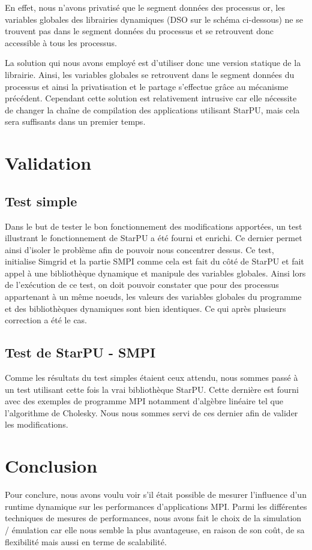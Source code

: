 \documentclass[smallextended]{svjour3}
\begin{document}
En effet, nous n'avons privatisé que le segment données des
processus or, les variables globales des librairies dynamiques (DSO
sur le schéma ci-dessous) ne se trouvent pas dans le segment données
du processus et se retrouvent donc accessible à tous les processus. 

La solution qui nous avons employé est d'utiliser donc une version
statique de la librairie. Ainsi, les variables globales se
retrouvent dans le segment données du processus et ainsi la
privatisation et le partage s'effectue grâce au mécanisme
précédent. Cependant cette solution est relativement intrusive car elle
nécessite de changer la chaîne de compilation des applications
utilisant StarPU, mais cela sera suffisants dans un premier temps. 

\section{Validation}
\label{sec-6}
\subsection{Test simple}
\label{sec-6-1}
Dans le but de tester le bon fonctionnement des modifications
apportées, un test illustrant le fonctionnement de StarPU a été
fourni et enrichi. Ce dernier permet ainsi d'isoler le problème
afin de pouvoir nous concentrer dessus. Ce test, initialise Simgrid
et la partie SMPI comme cela est fait du côté de StarPU et fait
appel à une bibliothèque dynamique et manipule des variables
globales. Ainsi lors de l'exécution de ce test, on doit pouvoir
constater que pour des processus appartenant à un même noeuds, les
valeurs des variables globales du programme et des bibliothèques
dynamiques sont bien identiques. Ce qui après plusieurs correction
a été le cas.  
\subsection{Test de StarPU - SMPI}
\label{sec-6-2}
Comme les résultats du test simples étaient ceux attendu, nous
sommes passé à un test utilisant cette fois la vrai bibliothèque
StarPU. Cette dernière est fourni avec des exemples de programme MPI
notamment d'algèbre linéaire tel que l'algorithme de Cholesky. Nous
nous sommes servi de ces dernier afin de valider les
modifications.

\section{Conclusion}
\label{sec-7}
Pour conclure, nous avons voulu voir s'il était possible de mesurer
l'influence d'un runtime dynamique sur les performances
d'applications MPI. Parmi les différentes techniques de mesures de
performances, nous avons fait le choix de la simulation / émulation
car elle nous semble la plus avantageuse, en raison de son coût, de
sa flexibilité mais aussi en terme de scalabilité.  
\end{document}
